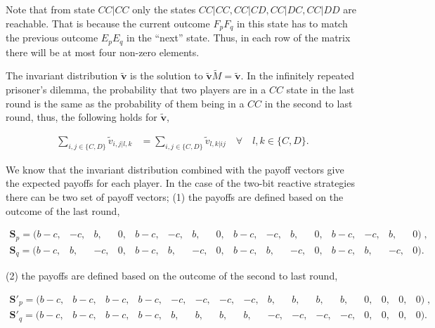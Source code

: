 \documentclass{article}
\theoremstyle{definition}
\begin{document}
Note that from state \(CC|CC\) only the states \(CC|CC, CC|CD, CC|DC, CC|DD\)
are reachable. That is because the current outcome \(F_p F_q\) in this state has
to match the previous outcome \(E_p E_q\) in the ``next'' state. Thus, in each
row of the matrix there will be at most four non-zero elements.

The invariant distribution \(\mathbf{\tilde{v}}\) is the solution to
\(\mathbf{\tilde{v}} \tilde{M} = \mathbf{\tilde{v}}\). In the infinitely
repeated prisoner's dilemma, the probability that two players are in a \(CC\)
state in the last round is the same as the probability of them being in a \(CC\)
in the second to last round, thus, the following holds for
\(\mathbf{\tilde{v}}\),

\begin{align}\label{eq:last_rounds_equality}
  \sum_{i, j \in \{C, D\}} \tilde{v}_{i, j | l, k} & = \sum_{i, j \in \{C, D\}} \tilde{v}_{l, k | ij} \quad \forall \quad l, k \in \{C, D\}.
\end{align}

We know that the invariant distribution combined with the payoff vectors give
the expected payoffs for each player. In the case of the two-bit reactive
strategies there can be two set of payoff vectors; (1) the payoffs are
defined based on the outcome of the last round,

\begin{equation}\label{eq:last_round_two_bits}
  \begin{array}{*{16}{c}}
    \mathbf{S}_{p} = ( b - c , & -c , & b , & 0 , & b - c , & -c , & b , & 0 , & b - c , & -c , & b , & 0 , & b - c , & -c , & b , & 0)  \;, \\
    \mathbf{S}_{q} = ( b - c, & b, & -c, & 0, & b - c, & b, & -c, & 0, & b - c, & b, & -c, & 0, & b - c, & b, & -c, & 0).
  \end{array}
\end{equation}

(2) the payoffs are defined based on the outcome of the second to last round,

\begin{equation}\label{eq:second_to_last_round_two_bits}
  \begin{array}{*{16}{c}}
    \mathbf{S}'_{p} = (b - c, & b - c, & b - c, & b - c, & -c, & -c, & -c, & -c, & b, & b, & b, & b, & 0, & 0, & 0, & 0)  \;, \\
    \mathbf{S}'_{q} = (b - c, & b - c, & b - c, & b - c, & b, & b, & b, & b, & -c, & -c, & -c, & -c, & 0, & 0, & 0, & 0).
  \end{array}
\end{equation}
\end{document}
